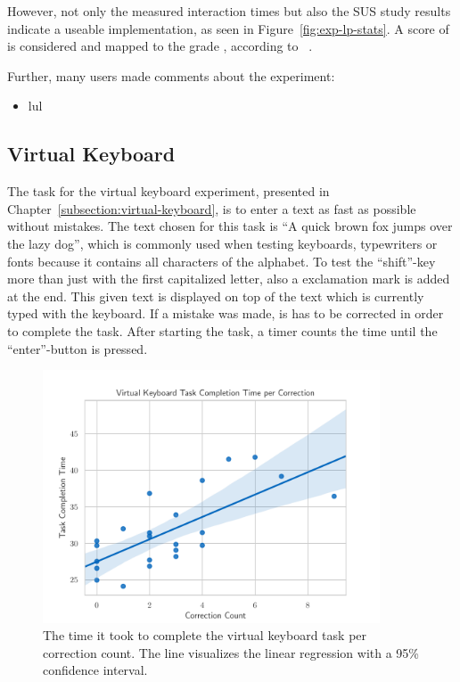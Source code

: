 However, not only the measured interaction times but also the \ac{SUS} study results indicate a useable implementation, as seen in Figure~\ref{fig:exp-lp-stats}. A score of \evalExpLpSusScore{} is considered \evalExpLpSusAdj{} and mapped to the grade \evalExpLpSusGrade{}, according to \citeauthor{Bangor.2009}~\cite[120\psq]{Bangor.2009}.


Further, many users made comments about the experiment:

\begin{itemize}
  \item lul
\end{itemize}




\subsection{Virtual Keyboard}\label{section:eval-res-vk}

The task for the virtual keyboard experiment, presented in Chapter~\ref{subsection:virtual-keyboard}, is to enter a text as fast as possible without mistakes. The text chosen for this task is \enquote{A quick brown fox jumps over the lazy dog}, which is commonly used when testing keyboards, typewriters or fonts because it contains all characters of the alphabet. To test the \enquote{shift}-key more than just with the first capitalized letter, also a exclamation mark is added at the end. This given text is displayed on top of the text which is currently typed with the keyboard. If a mistake was made, is has to be corrected in order to complete the task. After starting the task, a timer counts the time until the \enquote{enter}-button is pressed.

\begin{figure}[H]
  \centering
  \includegraphics[width=10cm]{figures/evaluation/eval_exp_vk_ratio_scatter.pdf}
  \caption[Virtual keyboard experiment results]{The time it took to complete the virtual keyboard task per correction count. The line visualizes the linear regression with a 95\% confidence interval.}\label{fig:eval-exp-vk-ratio-scatter}
\end{figure}


